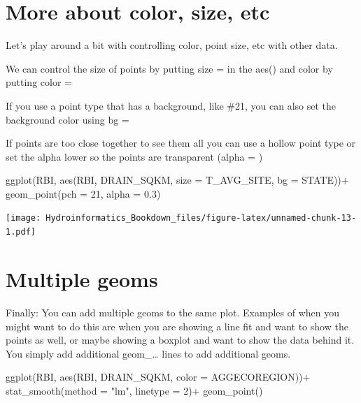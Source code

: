 \documentclass[
]{book}
\newenvironment{Shaded}{\begin{snugshade}}{\end{snugshade}}
\newcommand{\AttributeTok}[1]{\textcolor[rgb]{0.77,0.63,0.00}{#1}}
\newcommand{\DecValTok}[1]{\textcolor[rgb]{0.00,0.00,0.81}{#1}}
\newcommand{\FloatTok}[1]{\textcolor[rgb]{0.00,0.00,0.81}{#1}}
\newcommand{\FunctionTok}[1]{\textcolor[rgb]{0.00,0.00,0.00}{#1}}
\newcommand{\NormalTok}[1]{#1}
\newcommand{\SpecialCharTok}[1]{\textcolor[rgb]{0.00,0.00,0.00}{#1}}
\newcommand{\StringTok}[1]{\textcolor[rgb]{0.31,0.60,0.02}{#1}}
\begin{document}
\hypertarget{more-about-color-size-etc}{%
\section{More about color, size, etc}\label{more-about-color-size-etc}}

Let's play around a bit with controlling color, point size, etc with other data.

We can control the size of points by putting size = in the aes() and color by putting color =

If you use a point type that has a background, like \#21, you can also set the background color using bg =

If points are too close together to see them all you can use a hollow point type or set the alpha lower so the points are transparent (alpha = )

\begin{Shaded}
\begin{Highlighting}[]
\FunctionTok{ggplot}\NormalTok{(RBI, }\FunctionTok{aes}\NormalTok{(RBI, DRAIN\_SQKM, }\AttributeTok{size =}\NormalTok{ T\_AVG\_SITE, }\AttributeTok{bg =}\NormalTok{ STATE))}\SpecialCharTok{+}
  \FunctionTok{geom\_point}\NormalTok{(}\AttributeTok{pch =} \DecValTok{21}\NormalTok{, }\AttributeTok{alpha =} \FloatTok{0.3}\NormalTok{)}
\end{Highlighting}
\end{Shaded}

\texttt{[image: Hydroinformatics\_Bookdown\_files/figure-latex/unnamed-chunk-13-1.pdf]}

\hypertarget{multiple-geoms}{%
\section{Multiple geoms}\label{multiple-geoms}}

Finally: You can add multiple geoms to the same plot. Examples of when you might want to do this are when you are showing a line fit and want to show the points as well, or maybe showing a boxplot and want to show the data behind it. You simply add additional geom\_\ldots{} lines to add additional geoms.

\begin{Shaded}
\begin{Highlighting}[]
\FunctionTok{ggplot}\NormalTok{(RBI, }\FunctionTok{aes}\NormalTok{(RBI, DRAIN\_SQKM, }\AttributeTok{color =}\NormalTok{ AGGECOREGION))}\SpecialCharTok{+}
  \FunctionTok{stat\_smooth}\NormalTok{(}\AttributeTok{method =} \StringTok{"lm"}\NormalTok{, }\AttributeTok{linetype =} \DecValTok{2}\NormalTok{)}\SpecialCharTok{+}
  \FunctionTok{geom\_point}\NormalTok{()}
\end{Highlighting}
\end{Shaded}
\end{document}

